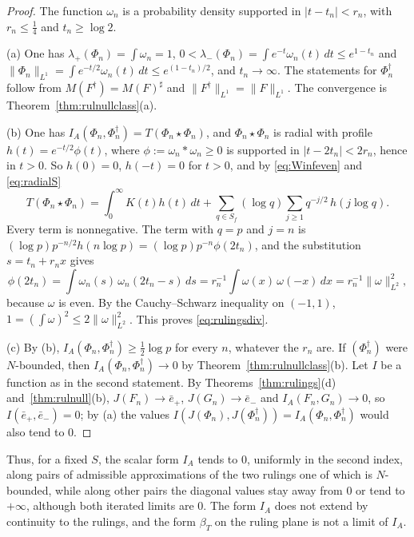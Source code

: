\documentclass[11pt]{amsart}
\theoremstyle{definition}
\theoremstyle{remark}
\begin{document}
\begin{proof}
The function $\omega_n$ is a probability density supported in
$|t-t_n|<r_n$, with $r_n\le\tfrac14$ and $t_n\ge\log2$.

(a)  One has $\lambda_+(\Phi_n)=\int\omega_n=1$,
$0<\lambda_-(\Phi_n)=\int e^{-t}\omega_n(t)\,dt\le e^{1-t_n}$ and
$\lVert\Phi_n\rVert_{L^1}=\int e^{-t/2}\omega_n(t)\,dt\le e^{(1-t_n)/2}$, and
$t_n\to\infty$.  The statements for $\Phi_n^{\dagger}$ follow from
$M(F^{\dagger})=M(F)^{\sharp}$ and
$\lVert F^{\dagger}\rVert_{L^1}=\lVert F\rVert_{L^1}$.  The convergence is
Theorem~\ref{thm:rulnullclass}(a).

(b)  One has $I_A(\Phi_n,\Phi_n^{\dagger})=T(\Phi_n\star\Phi_n)$, and
$\Phi_n\star\Phi_n$ is radial with profile $h(t)=e^{-t/2}\phi(t)$, where
$\phi:=\omega_n*\omega_n\ge0$ is supported in $|t-2t_n|<2r_n$, hence in
$t>0$.  So $h(0)=0$, $h(-t)=0$ for $t>0$, and by \eqref{eq:Winfeven} and
\eqref{eq:radialS}
\[
T(\Phi_n\star\Phi_n)=\int_0^{\infty}K(t)h(t)\,dt
+\sum_{q\in S_f}(\log q)\sum_{j\ge1}q^{-j/2}\,h(j\log q).
\]
Every term is nonnegative.  The term with $q=p$ and $j=n$ is
$(\log p)p^{-n/2}h(n\log p)=(\log p)p^{-n}\phi(2t_n)$, and the substitution
$s=t_n+r_nx$ gives
\[
\phi(2t_n)=\int\omega_n(s)\,\omega_n(2t_n-s)\,ds
=r_n^{-1}\int\omega(x)\,\omega(-x)\,dx=r_n^{-1}\lVert\omega\rVert_{L^2}^{2},
\]
because $\omega$ is even.  By the Cauchy--Schwarz inequality on $(-1,1)$,
$1=(\int\omega)^{2}\le2\lVert\omega\rVert_{L^2}^{2}$.  This proves
\eqref{eq:rulingsdiv}.

(c)  By (b), $I_A(\Phi_n,\Phi_n^{\dagger})\ge\tfrac12\log p$ for every $n$,
whatever the $r_n$ are.  If $(\Phi_n^{\dagger})$ were $N$-bounded, then
$I_A(\Phi_n,\Phi_n^{\dagger})\to0$ by Theorem~\ref{thm:rulnullclass}(b).  Let
$I$ be a function as in the second statement.  By
Theorems~\ref{thm:rulings}(d) and~\ref{thm:rulnull}(b),
$J(F_n)\to\bar e_+$, $J(G_n)\to\bar e_-$ and $I_A(F_n,G_n)\to0$, so
$I(\bar e_+,\bar e_-)=0$; by (a) the values
$I(J(\Phi_n),J(\Phi_n^{\dagger}))=I_A(\Phi_n,\Phi_n^{\dagger})$ would also
tend to $0$.
\end{proof}

Thus, for a fixed $S$, the scalar form $I_A$ tends to $0$, uniformly in the second
index, along pairs of admissible approximations of the two rulings one of
which is $N$-bounded, while along other pairs the diagonal values stay away
from $0$ or tend to $+\infty$, although both iterated limits are $0$.  The form $I_A$
does not extend by continuity to the rulings, and the form $\beta_T$ on the
ruling plane is not a limit of $I_A$.
\end{document}
